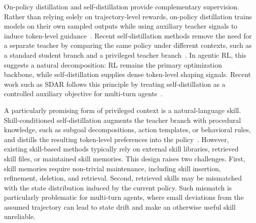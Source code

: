 On-policy distillation and self-distillation provide complementary supervision. Rather than relying solely on trajectory-level rewards, on-policy distillation trains models on their own sampled outputs while using auxiliary teacher signals to induce token-level guidance~\citep{gu2023minillm,agarwal2024onpolicy}. Recent self-distillation methods remove the need for a separate teacher by comparing the same policy under different contexts, such as a standard student branch and a privileged teacher branch~\citep{zhao2026opsd,he2026sdzero}. In agentic RL, this suggests a natural decomposition: RL remains the primary optimization backbone, while self-distillation supplies dense token-level shaping signals. Recent work such as SDAR follows this principle by treating self-distillation as a controlled auxiliary objective for multi-turn agents~\citep{lu2026sdar}.

A particularly promising form of privileged context is a natural-language skill. Skill-conditioned self-distillation augments the teacher branch with procedural knowledge, such as subgoal decompositions, action templates, or behavioral rules, and distills the resulting token-level preferences into the policy~\citep{lu2026skill0,wang2026skillsd,lu2026sdar}. However, existing skill-based methods typically rely on external skill libraries, retrieved skill files, or maintained skill memories. This design raises two challenges. First, skill memories require non-trivial maintenance, including skill insertion, refinement, deletion, and retrieval. Second, retrieved skills may be mismatched with the state distribution induced by the current policy. Such mismatch is particularly problematic for multi-turn agents, where small deviations from the assumed trajectory can lead to state drift and make an otherwise useful skill unreliable.

